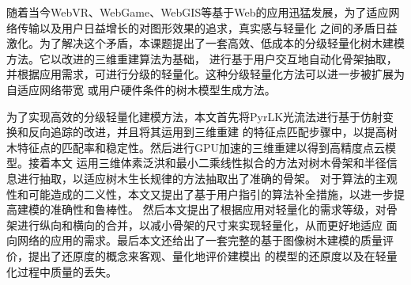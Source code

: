 


\makeatletter
  \iftongji@doctor
  \else
    \iftongji@master
    \fi
  \fi

\makeatother








\cassosupervisor{}

\ccosupervisor{}

\begin{cabstract}
随着当今WebVR、WebGame、WebGIS等基于Web的应用迅猛发展，为了适应网络传输以及用户日益增长的对图形效果的追求，真实感与轻量化
之间的矛盾日益激化。为了解决这个矛盾，本课题提出了一套高效、低成本的分级轻量化树木建模方法。它以改进的三维重建算法为基础，
进行基于用户交互地自动化骨架抽取，并根据应用需求，可进行分级的轻量化。这种分级轻量化方法可以进一步被扩展为自适应网络带宽
或用户硬件条件的树木模型生成方法。

为了实现高效的分级轻量化建模方法，本文首先将PyrLK光流法进行基于仿射变换和反向追踪的改进，并且将其运用到三维重建
的特征点匹配步骤中，以提高树木特征点的匹配率和稳定性。然后进行GPU加速的三维重建以得到高精度点云模型。接着本文
运用三维体素泛洪和最小二乘线性拟合的方法对树木骨架和半径信息进行抽取，以适应树木生长规律的方法抽取出了准确的骨架。
对于算法的主观性和可能造成的二义性，本文又提出了基于用户指引的算法补全措施，以进一步提高建模的准确性和鲁棒性。
然后本文提出了根据应用对轻量化的需求等级，对骨架进行纵向和横向的合并，以减小骨架的尺寸来实现轻量化，从而更好地适应
面向网络的应用的需求。最后本文还给出了一套完整的基于图像树木建模的质量评价，提出了还原度的概念来客观、量化地评价建模出
的模型的还原度以及在轻量化过程中质量的丢失。
\end{cabstract}

